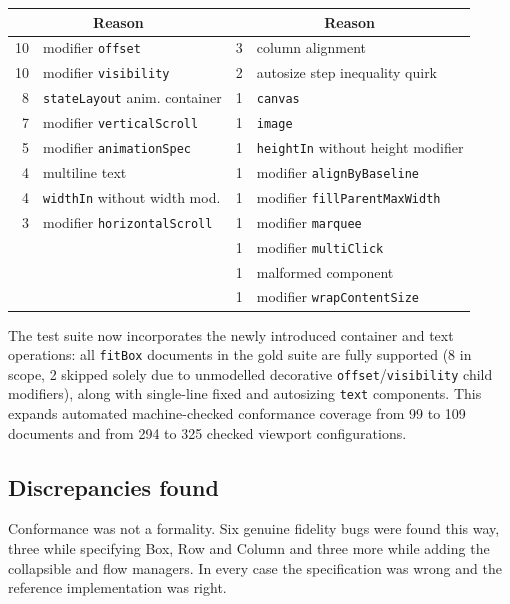 \documentclass[11pt,a4paper]{article}
\newcommand{\jv}[1]{\texttt{#1}}       %
\theoremstyle{definition}
\theoremstyle{plain}
\theoremstyle{remark}
\begin{document}
\begin{center}
\begin{tabular}{@{}rl@{\qquad}rl@{}}
\toprule
\multicolumn{2}{c}{\textbf{Reason}} & \multicolumn{2}{c}{\textbf{Reason}} \\
\midrule
10 & modifier \jv{offset}             &  3 & column alignment \\
10 & modifier \jv{visibility}         &  2 & autosize step inequality quirk \\
 8 & \jv{stateLayout} anim. container &  1 & \jv{canvas} \\
 7 & modifier \jv{verticalScroll}     &  1 & \jv{image} \\
 5 & modifier \jv{animationSpec}      &  1 & \jv{heightIn} without height modifier \\
 4 & multiline text                   &  1 & modifier \jv{alignByBaseline} \\
 4 & \jv{widthIn} without width mod.  &  1 & modifier \jv{fillParentMaxWidth} \\
 3 & modifier \jv{horizontalScroll}   &  1 & modifier \jv{marquee} \\
   &                                  &  1 & modifier \jv{multiClick} \\
   &                                  &  1 & malformed component \\
   &                                  &  1 & modifier \jv{wrapContentSize} \\
\bottomrule
\end{tabular}
\end{center}

The test suite now incorporates the newly introduced container and text operations: all \jv{fitBox} documents in the gold suite are fully supported (8 in scope, 2 skipped solely due to unmodelled decorative \jv{offset}/\jv{visibility} child modifiers), along with single-line fixed and autosizing \jv{text} components. This expands automated machine-checked conformance coverage from 99 to 109 documents and from 294 to 325 checked viewport configurations.

\subsection{Discrepancies found}
\label{sec:discrepancies}

Conformance was not a formality. Six genuine fidelity bugs were found this way,
three while specifying Box, Row and Column and three more while adding the
collapsible and flow managers. In every case the specification was wrong and the
reference implementation was right.
\end{document}
